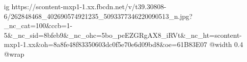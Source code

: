  
 
 
 
 

\ifcmt
  ig https://scontent-mxp1-1.xx.fbcdn.net/v/t39.30808-6/262848468_402690574921235_5093377346220090513_n.jpg?_nc_cat=100&ccb=1-5&_nc_sid=8bfeb9&_nc_ohc=5bo_peEZGRgAX8_iRVt&_nc_ht=scontent-mxp1-1.xx&oh=8a8fe48f83350603dc0f5e70e6d09bd8&oe=61B83E07
  @width 0.4
  @wrap 
\fi
